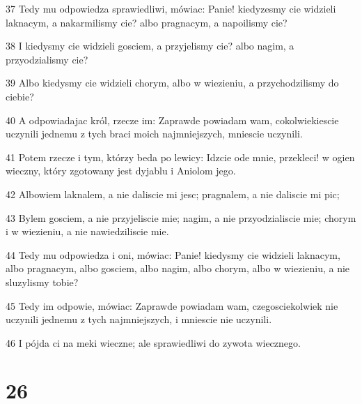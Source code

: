 \par 37 Tedy mu odpowiedza sprawiedliwi, mówiac: Panie! kiedyzesmy cie widzieli laknacym, a nakarmilismy cie? albo pragnacym, a napoilismy cie?
\par 38 I kiedysmy cie widzieli gosciem, a przyjelismy cie? albo nagim, a przyodzialismy cie?
\par 39 Albo kiedysmy cie widzieli chorym, albo w wiezieniu, a przychodzilismy do ciebie?
\par 40 A odpowiadajac król, rzecze im: Zaprawde powiadam wam, cokolwiekiescie uczynili jednemu z tych braci moich najmniejszych, mniescie uczynili.
\par 41 Potem rzecze i tym, którzy beda po lewicy: Idzcie ode mnie, przekleci! w ogien wieczny, który zgotowany jest dyjablu i Aniolom jego.
\par 42 Albowiem laknalem, a nie daliscie mi jesc; pragnalem, a nie daliscie mi pic;
\par 43 Bylem gosciem, a nie przyjeliscie mie; nagim, a nie przyodzialiscie mie; chorym i w wiezieniu, a nie nawiedziliscie mie.
\par 44 Tedy mu odpowiedza i oni, mówiac: Panie! kiedysmy cie widzieli laknacym, albo pragnacym, albo gosciem, albo nagim, albo chorym, albo w wiezieniu, a nie sluzylismy tobie?
\par 45 Tedy im odpowie, mówiac: Zaprawde powiadam wam, czegosciekolwiek nie uczynili jednemu z tych najmniejszych, i mniescie nie uczynili.
\par 46 I pójda ci na meki wieczne; ale sprawiedliwi do zywota wiecznego.

\chapter{26}

